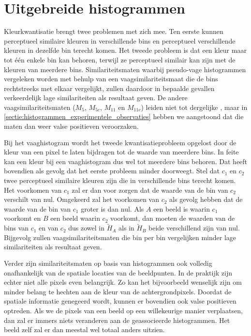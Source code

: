 \section{Uitgebreide histogrammen}

Kleurkwantisatie brengt twee problemen met zich mee. Ten eerste kunnen 
perceptueel similaire kleuren in verschillende bins en perceptueel 
verschillende kleuren in dezelfde bin terecht komen. Het tweede probleem is dat 
een kleur maar tot \'e\'en enkele bin kan behoren, terwijl ze perceptueel 
similair kan zijn met de kleuren van meerdere bins. Similariteitsmaten waarbij 
pseudo-vage histogrammen vergeleken worden met behulp van een 
vaagsimilariteitsmaat die de bins rechtstreeks met elkaar vergelijkt, zullen 
daardoor in bepaalde gevallen verkeerdelijk lage similariteiten als resultaat 
geven. De andere vaagsimilariteitsmaten ($M_5$, $M_{5c}$, $M_{11}$ en 
$M_{11c}$) leiden niet tot dergelijke , maar in 
\ref{sectie:histogrammen_experimentele_observaties} hebben we aangetoond dat 
die maten dan weer valse positieven veroorzaken.

Bij het vaaghistogram wordt het tweede kwantisatieprobleem opgelost
door de kleur van een pixel te laten bijdragen tot de waarde van meerdere bins. In feite kan een kleur
bij een vaaghistogram dus wel tot meerdere bins behoren. Dat heeft
bovendien als gevolg dat het eerste probleem minder doorweegt. Stel dat $c_1$ en $c_2$ twee perceptueel
similaire kleuren zijn die in verschillende bins terecht komen. Het
voorkomen van $c_1$ zal er dan voor zorgen dat de waarde van de bin van $c_2$ verschilt van nul.
Omgekeerd zal het voorkomen van $c_2$ als gevolg hebben dat de waarde van de bin van $c_1$ groter is
dan nul. Als $A$ een beeld is waarin $c_1$ voorkomt en $B$ een beeld waarin $c_2$ voorkomt, dan
moeten de waarden van de bins van $c_1$ en van $c_2$ dus zowel in $\widetilde{H}_A$ als in 
$\widetilde{H}_B$ beide verschillend zijn van nul. Bijgevolg zullen vaagsimilariteitsmaten
die bin per bin vergelijken minder lage similariteiten als resultaat geven.

Verder zijn similariteitsmaten op basis van histogrammen ook volledig onafhankelijk van de 
spatiale locaties van de beeldpunten. In
de praktijk zijn echter niet alle pixels even belangrijk. Zo kan het
bijvoorbeeld wenselijk zijn om minder belang te hechten aan de kleur van
de achtergrondpixels. Doordat de spatiale informatie genegeerd wordt,
kunnen er bovendien ook valse positieven optreden. Als we de pixels van een
beeld op een willekeurige manier verplaatsen, dan zal er immers niets veranderen aan
de geassocieerde histogrammen. Het beeld zelf zal er dan meestal wel totaal anders uitzien.  

